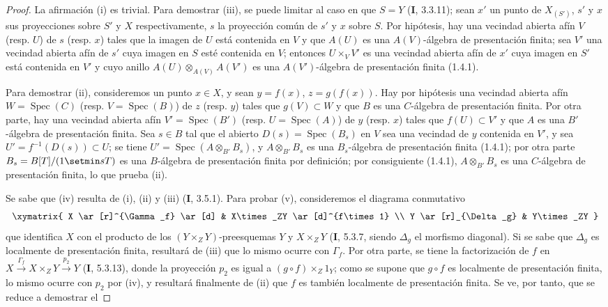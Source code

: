 \begin{proof}
La afirmación (i) es trivial. Para demostrar (iii), se puede limitar al caso
en que $S=Y$ (\textbf{I}, 3.3.11); sean $x'$ un punto de $X_{(S')}$, $s'$ y $x$ sus
proyecciones sobre $S'$ y $X$ respectivamente, $s$ la proyección común de $s'$
y $x$ sobre $S$. Por hipótesis, hay una vecindad abierta afín $V$ (resp.
$U$) de $s$ (resp. $x$) tales que la imagen de $U$ está contenida en $V$ y que
$A(U)$ es una $A(V)$-álgebra de presentación finita; sea $V'$ una vecindad
abierta afín de $s'$ cuya imagen en $S$ esté contenida en $V$; entonces
$U\times_VV'$ es una vecindad abierta afín de $x'$ cuya imagen en $S'$
está contenida en $V'$ y cuyo anillo $A(U)\otimes_{A(V)}A(V')$ es una
$A(V')$-álgebra de presentación finita (1.4.1).

Para demostrar (ii), consideremos un punto $x\in X$, y sean $y=f(x)$,
$z=g(f(x))$. Hay por hipótesis una vecindad abierta afín $W=\operatorname{Spec}(C)$
(resp. $V=\operatorname{Spec}(B)$) de $z$ (resp. $y$) tales que $g(V)\subset W$ y que $B$
es una $C$-álgebra de presentación finita. Por otra parte, hay una vecindad
abierta afín $V'=\operatorname{Spec}(B')$ (resp. $U=\operatorname{Spec}(A)$) de $y$ (resp. $x$) tales que
$f(U)\subset V'$ y que $A$ es una $B'$-álgebra de presentación finita. Sea
$s\in B$ tal que el abierto $D(s)=\operatorname{Spec}(B_s)$ en $V$ sea una vecindad de $y$
contenida en $V'$, y sea $U'=f^{-1}(D(s))\subset U$; se tiene
$U'=\operatorname{Spec}(A\otimes_{B'}B_s)$, y $A\otimes_{B'}B_s$ es una $B_s$-álgebra de
presentación finita (1.4.1); por otra parte $B_s=B[T]/(1\setmin sT)$ es una
$B$-álgebra de presentación finita por definición; por consiguiente (1.4.1),
$A\otimes_{B'}B_s$ es una $C$-álgebra de presentación finita, lo que prueba
(ii).

Se sabe que (iv) resulta de (i), (ii) y (iii) (\textbf{I}, 3.5.1). Para probar (v),
consideremos el diagrama conmutativo
\[
\xymatrix{
X \ar[r]^{\Gamma_f} \ar[d] & X\times_ZY \ar[d]^{f\times 1} \\
Y \ar[r]_{\Delta_g} & Y\times_ZY
}
\]
que identifica $X$ con el producto de los $(Y\times_ZY)$-preesquemas $Y$ y
$X\times_ZY$ (\textbf{I}, 5.3.7, siendo $\Delta_g$ el morfismo diagonal). Si se sabe
que $\Delta_g$ es localmente de presentación finita, resultará de
(iii) que lo mismo ocurre con $\Gamma_f$. Por otra parte, se tiene la factorización
de $f$ en
$X\xrightarrow{\Gamma_f}X\times_ZY\xrightarrow{p_2}Y$ (\textbf{I}, 5.3.13), donde la
proyección $p_2$ es igual a $(g\circ f)\times_Z1_Y$; como se supone que $g\circ f$ es
localmente de presentación finita, lo mismo ocurre con $p_2$ por
(iv), y resultará finalmente de (ii) que $f$ es también localmente de
presentación finita. Se ve, por tanto, que se reduce a demostrar el
\end{proof}


